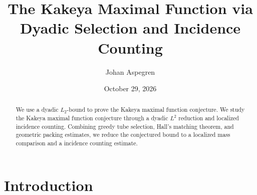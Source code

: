 \documentclass[11pt, letterpaper]{nyjm}
\title{The Kakeya Maximal Function via Dyadic Selection and Incidence Counting}
\author{Johan Aspegren}
\date{October 29, 2026}
\begin{document}
	
	\begin{abstract}
			We use a dyadic $L_2$-bound to prove the Kakeya maximal function conjecture. We study the Kakeya maximal function conjecture through a dyadic \(L^2\) reduction and localized incidence counting. Combining greedy tube selection, Hall's matching theorem, and geometric packing estimates, we reduce the conjectured bound to a localized mass comparison and a incidence counting estimate.  
	\end{abstract}
	
	\maketitle
	
	\tableofcontents


	
	

\section{Introduction}
\end{document}
